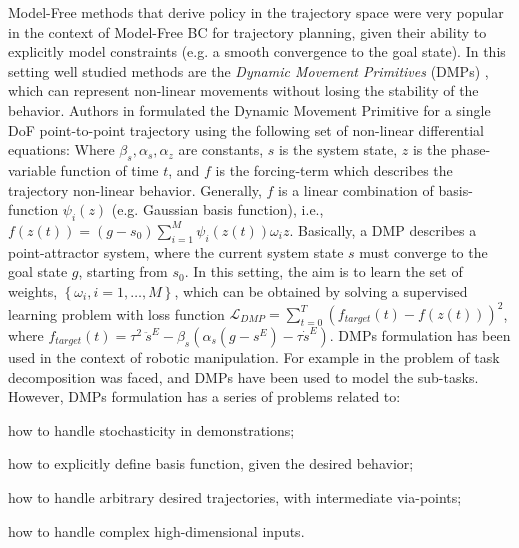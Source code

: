 Model-Free methods that derive policy in the trajectory space were very popular in the context of Model-Free BC for trajectory planning, given their ability to explicitly model constraints (e.g. a smooth convergence to the goal state). In this setting well studied methods are the \textit{Dynamic Movement Primitives} (DMPs) \cite{ijspeert2002learning,ijspeert2013dynamical}, which can represent non-linear movements without losing the stability of the behavior.  
Authors in \cite{ijspeert2013dynamical} formulated the Dynamic Movement Primitive for a single DoF point-to-point trajectory using the following set of non-linear differential equations:  Where $\beta_{s}, \alpha_{s}, \alpha_{z}$ are constants, $s$ is the system state, $z$ is the phase-variable function of time $t$, and $f$ is the forcing-term which describes the trajectory non-linear behavior. Generally, $f$ is a linear combination of basis-function $\psi_{i}(z)$ (e.g. Gaussian basis function), i.e., $f(z(t)) = (g-s_{0}) \sum_{i=1}^{M}\psi_{i}(z(t))\omega_{i}z$. Basically, a DMP describes a point-attractor system, where the current system state $s$ must converge to the goal state $g$, starting from $s_{0}$. In this setting, the aim is to learn the set of weights, $\left\{\omega_{i}, i=1,\dots,M\right\}$, which can be obtained by solving a supervised learning problem with loss function $\mathcal{L}_{DMP} = \sum_{t=0}^{T}(f_{target}(t) - f(z(t)))^{2}$, where $f_{target}(t) = \tau^{2} \ \ddot{s}^{E} - \beta_{s}(\alpha_{s}(g - s^{E})-\tau \dot{s}^{E})$. DMPs formulation has been used in the context of robotic manipulation. For example in \cite{meier2011movement_primitive,caccavale2019kinesthetic,agostini2020manipulation} the problem of task decomposition was faced, and DMPs have been used to model the sub-tasks. However, DMPs formulation has a series of problems related to: \begin{enumerate*}[label=(\textbf{\alph*})]
    \item how to handle stochasticity in demonstrations;
    \item how to explicitly define basis function, given the desired behavior;
    \item how to handle arbitrary desired trajectories, with intermediate via-points;
    \item how to handle complex high-dimensional inputs. 
\end{enumerate*}
